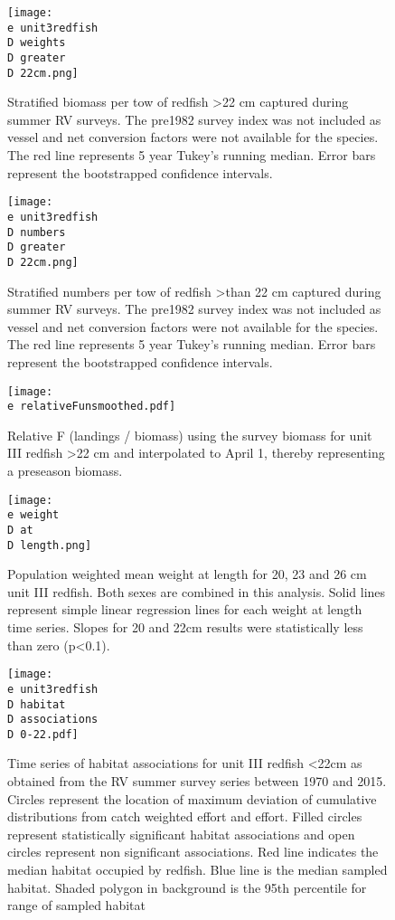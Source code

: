 \documentclass[11pt]{article}
\newcommand{\D}{.}
\newcommand{\e}{/home/ecomod_data/redfish/figures/}
\begin{document}
\begin{figure}
\centering
    
    \texttt{[image: \\e unit3redfish\\D weights\\D greater\\D 22cm.png]}
    \caption{Stratified biomass per tow of redfish \textgreater 22 cm captured during summer RV surveys. The pre1982 survey index was not included as vessel and net conversion factors were not available for the species. The red line represents 5 year Tukey's running median. Error bars represent the bootstrapped confidence intervals.}

\end{figure}
%
%
\begin{figure}
\centering
    
    \texttt{[image: \\e unit3redfish\\D numbers\\D greater\\D 22cm.png]}
    \caption{Stratified numbers per tow of redfish \textgreater than 22 cm  captured during summer RV surveys. The pre1982 survey index was not included as vessel and net conversion factors were not available for the species. The red line represents 5 year Tukey's running median. Error bars represent the bootstrapped confidence intervals.}

\end{figure}
\clearpage

\begin{figure}
\centering
    
    \texttt{[image: \\e relativeFunsmoothed.pdf]}
    \caption{Relative F (landings / biomass) using the survey biomass for unit III redfish \textgreater 22 cm and interpolated to April 1, thereby representing a preseason biomass.}

\end{figure}
\clearpage


\begin{figure}
\centering
    
    \texttt{[image: \\e weight\\D at\\D length.png]}
    \caption{Population weighted mean weight at length for 20, 23 and 26 cm unit III redfish. Both sexes are combined in this analysis. Solid lines represent simple linear regression lines for each weight at length time series. Slopes for 20 and 22cm results were statistically less than zero (p\textless 0.1). }

\end{figure}
\clearpage

\begin{figure}
\centering
    
    \texttt{[image: \\e unit3redfish\\D habitat\\D associations\\D 0-22.pdf]}
    \caption{Time series of habitat associations for unit III redfish \textless 22cm as obtained from the RV summer survey
series between 1970 and 2015. Circles represent the location of maximum deviation of
cumulative distributions from catch weighted effort and effort. Filled circles represent statistically
significant habitat associations and open circles represent non significant associations. Red line indicates
the median habitat occupied by redfish. Blue line is the median sampled habitat. Shaded polygon in
background is the 95th percentile for range of sampled habitat}
\end{figure}
\clearpage
\end{document}

